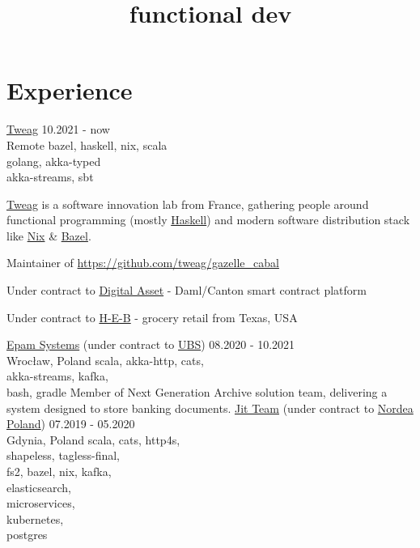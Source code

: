 \documentclass[a4paper,11pt]{cv4tw}%
\title{functional dev}
\begin{document}
\section{Experience}
      {\href{https://www.tweag.io}{Tweag}}
      {10.2021 - now\\Remote}
      {bazel, haskell, nix, scala\\golang, akka-typed\\akka-streams, sbt}
      { \href{tweag.io}{Tweag} is a software innovation lab from France, gathering people around
        functional programming (mostly \href{https://www.haskell.org}{Haskell}) and modern
        software distribution stack like \href{https://nixos.org}{Nix} \& \href{https://bazel.build}{Bazel}.
        \begin{missions}
        \item Maintainer of \href{https://github.com/tweag/gazelle_cabal}{https://github.com/tweag/gazelle\_cabal}
        \item Under contract to \href{https://www.digitalasset.com}{Digital Asset} -
          Daml/Canton smart contract platform
        \item Under contract to \href{https://www.heb.com}{H-E-B} -
          grocery retail from Texas, USA
        \end{missions}
      }
      {\href{https://www.epam.com}{Epam Systems} (under contract to \href{https://www.ubs.com}{UBS})}
      {08.2020 - 10.2021\\Wrocław, Poland}
      {scala, akka-http, cats,\\akka-streams, kafka,\\bash, gradle}
      {Member of Next Generation Archive solution team, delivering a system designed to store banking documents.
      }
      {\href{https://www.jit.team}{Jit Team} (under contract to \href{https://www.nordea.com}{Nordea Poland})}
      {07.2019 - 05.2020\\Gdynia, Poland}
      {scala, cats, http4s,\\shapeless, tagless-final,\\fs2, bazel, nix, kafka,\\elasticsearch,\\microservices,\\kubernetes,\\postgres
      }
\end{document}
